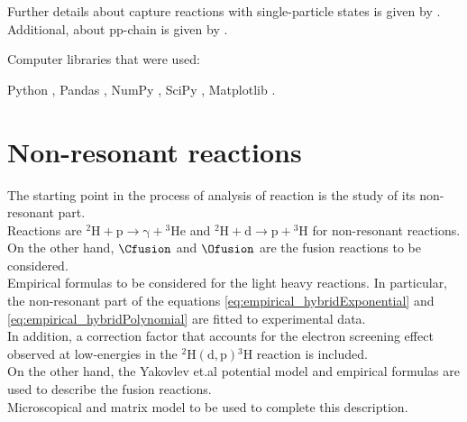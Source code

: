 \documentclass[openany]{book}
\begin{document}
Further details about capture reactions with single-particle states is given by \cite{huang_bertulani_guimaraes_2010}. \\

Additional, about pp-chain is given by \cite{adelberger_garcia_robertson_snover_balantekin_heeger_ramsey-musolf_bemmerer_junghans_bertulani_et_2011}.

Computer libraries that were used:

Python \cite{rossum_drake_2009}, Pandas \cite{mckinney_2010}, NumPy \cite{harris_millman_vanderwalt_gommers_virtanen_cournapeau_wieser_taylor_berg_smith_et_2020}, SciPy \cite{virtanen_gommers_oliphant_haberland_reddy_cournapeau_burovski_peterson_weckesser_bright_et_2020}, Matplotlib \cite{hunter_2007}.


\section{Non-resonant reactions} \label{sec:nonResonant}

The starting point in the process of analysis of reaction is the study of its non-resonant part. \\

Reactions are $\mathrm{{}^{2}{H} + p \rightarrow \gamma +  {}^{3}{He} } $ and $\mathrm{{}^{2}{H} + d  \rightarrow p+  {}^{3}{H}} $ for non-resonant reactions. On the other hand,  $\Cfusion$  and $\Ofusion$ are the fusion reactions to be considered. \\

Empirical formulas to be considered for the light heavy reactions. In particular, the non-resonant part of the equations \ref{eq:empirical_hybridExponential}  and \ref{eq:empirical_hybridPolynomial} are fitted to experimental data.  \\

In addition, a correction factor that accounts for the electron screening effect observed at low-energies  in the $\mathrm{{}^{2}H(d, p){}^{3}H}$ reaction is included. \\
 
On the other hand, the Yakovlev et.al  potential model and empirical formulas are used to describe the fusion reactions. \\

Microscopical and matrix model to be used to complete this description.



\end{document}
